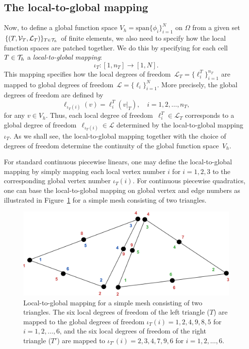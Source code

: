 \subsection{The local-to-global mapping}

Now, to define a global function space $V_h = \mathrm{span}
\{\phi_i\}_{i=1}^N$ on $\Omega$ from a given set $\{(T,
\mathcal{V}_T,\mathcal{L}_T)\}_{T\in\mathcal{T}_h}$ of finite elements, we
also need to specify how the local function spaces are patched
together. We do this by specifying for each cell $T \in \mathcal{T}_h$ a
\emph{local-to-global mapping}:
\begin{equation}
  \iota_T : [1, n_T] \rightarrow [1, N].
\end{equation}
This mapping specifies how the local degrees of freedom~$\mathcal{L}_T =
\{\ell_i^T\}_{i=1}^{n_T}$ are mapped to global degrees of
freedom~$\mathcal{L} = \{\ell_i\}_{i=1}^N$. More precisely, the global
degrees of freedom are defined by
\begin{equation} \label{eq:nodemapping}
  \ell_{\iota_T(i)}(v) = \ell^T_i(v|_T), \quad i = 1,2,\ldots,n_T,
\end{equation}
for any $v\in V_h$. Thus, each local degree of freedom~$\ell^T_i \in
\mathcal{L}_T$ corresponds to a global degree of
freedom~$\ell_{\iota_T(i)} \in \mathcal{L}$ determined by the
local-to-global mapping $\iota_T$. As we shall see, the
local-to-global mapping together with the choice of degrees of freedom
determine the continuity of the global function space~$V_h$.

For standard continuous piecewise linears, one may define the
local-to-global mapping by simply mapping each local vertex number $i$
for $i=1,2,3$ to the corresponding global vertex number
$\iota_T(i)$. For continuous piecewise quadratics, one can base the
local-to-global mapping on global vertex and edge numbers as
illustrated in Figure~\ref{fig:dofmap} for a simple mesh consisting of
two triangles.

\begin{figure}
\bwfig
  \centering
  \includegraphics[width=\largefig]{chapters/kirby-7/pdf/dofmap.pdf}
  \caption{Local-to-global mapping for a simple mesh consisting of
    two triangles. The six local degrees of freedom of the left
    triangle ($T$) are mapped to the global degrees of freedom
    $\iota_T(i) = 1, 2, 4, 9, 8, 5$ for $i = 1, 2, \ldots, 6$, and
    the six local degrees of freedom of the right triangle ($T'$)
    are mapped to $\iota_{T'}(i) = 2, 3, 4, 7, 9, 6$ for $i = 1, 2,
    \ldots, 6$.}
  \label{fig:dofmap}
\end{figure}

